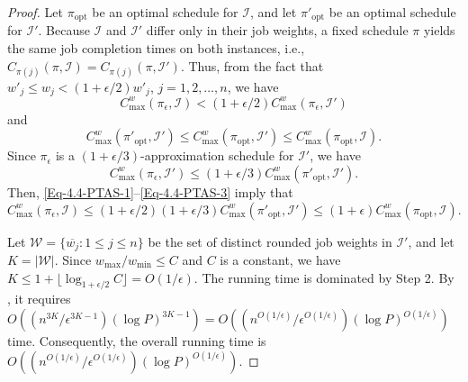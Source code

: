 \documentclass[12pt]{article}
\begin{document}
\begin{sloppypar}
        \begin{proof}
            Let $\pi_{\mathrm{opt}}$ be an optimal schedule for $\mathcal{I}$, and let $\pi'_{\mathrm{opt}}$ be an optimal schedule for $\mathcal{I}'$. 
            Because $\mathcal{I}$ and $\mathcal{I}'$ differ only in their job weights, a fixed schedule $\pi$ yields the same job completion times on both instances, i.e., $C_{\pi(j)}(\pi,\mathcal{I})=C_{\pi(j)}(\pi, \mathcal{I}')$. Thus, from the fact that $w'_j \leq w_j < (1+\epsilon/2) w'_j$, $j=1, 2, \ldots, n$, we have 
            \begin{equation} \label{Eq-4.4-PTAS-1}
                C_{\max}^w(\pi_{\epsilon}, \mathcal{I}) < (1+\epsilon/2)C_{\max}^w(\pi_{\epsilon}, \mathcal{I}')                      
            \end{equation}
            and
            \begin{equation} \label{Eq-4.4-PTAS-2}
                C_{\max}^w(\pi'_{\mathrm{opt}}, \mathcal{I}') \leq C_{\max}^w(\pi_{\mathrm{opt}}, \mathcal{I}') \leq C_{\max}^w(\pi_{\mathrm{opt}}, \mathcal{I}).                       
            \end{equation}
            Since $\pi_{\epsilon}$ is a $(1+\epsilon/3)$-approximation schedule for $\mathcal{I}'$, we have
            \begin{equation} \label{Eq-4.4-PTAS-3}
                C_{\max}^w(\pi_{\epsilon}, \mathcal{I}') \leq (1+\epsilon/3) C_{\max}^w(\pi'_{\mathrm{opt}}, \mathcal{I}').            
            \end{equation}  
            Then, \cref{Eq-4.4-PTAS-1}--\cref{Eq-4.4-PTAS-3} imply that
            \begin{equation*} 
                C_{\max}^w(\pi_{\epsilon}, \mathcal{I}) \leq (1+\epsilon/2) (1+\epsilon/3) C_{\max}^w(\pi'_{\mathrm{opt}}, \mathcal{I}')  \leq  (1+\epsilon)C_{\max}^w(\pi_{\mathrm{opt}},\mathcal{I}).
            \end{equation*}
            
            Let $\mathcal{W}=\{\overline{w_j}: 1 \leq j \leq n\}$ be the set of distinct rounded job weights in $\mathcal{I}'$, and let $K=|\mathcal{W}|$. Since $w_{\max}/w_{\min} \leq C$ and $C$ is a constant, we have $K \leq 1+ \lfloor \log_{1+\epsilon/2} C \rfloor =O(1/\epsilon)$. The running time is dominated by Step 2. By , it requires $O((n^{3K}/\epsilon^{3K-1}) (\log P)^{3K-1})=O((n^{O(1/\epsilon)}/\epsilon^{O(1/\epsilon)}) (\log P)^{O(1/\epsilon)})$ time. Consequently, the overall running time is $O((n^{O(1/\epsilon)}/\epsilon^{O(1/\epsilon)}) (\log P)^{O(1/\epsilon)})$.     
        \end{proof}
        

\end{sloppypar}
\end{document}
